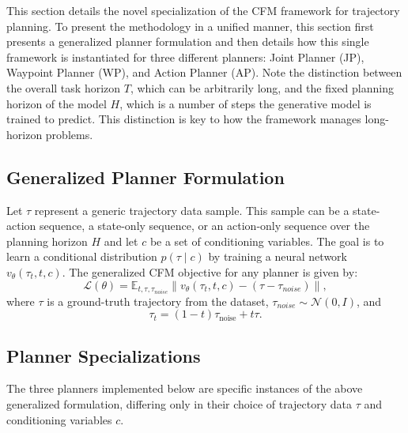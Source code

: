 This section details the novel specialization of the CFM framework for trajectory planning. To present the methodology in a unified manner, this section first presents a generalized planner formulation and then details how this single framework is instantiated for three different planners: Joint Planner (JP), Waypoint Planner (WP), and Action Planner (AP).  Note the distinction between the overall task horizon $T$, which can be arbitrarily long, and the fixed planning horizon of the model $H$, which is a number of steps the generative model is trained to predict. This distinction is key to how the framework manages long-horizon problems.
\subsection{Generalized Planner Formulation}
Let $\tau$ represent a generic trajectory data sample. This sample can be a state-action sequence, a state-only sequence, or an action-only sequence over the planning horizon $H$ and let $c$ be a set of conditioning variables. The goal is to learn a conditional distribution $p(\tau \mid c)$ by training a neural network $v_{\theta}(\tau_t, t, c)$. 
The generalized CFM objective for any planner is given by:
\begin{equation}
	\mathcal{L}(\theta) = \mathbb{E}_{t, \tau, \tau_{noise}} 
\|v_{\theta}(\tau_t, t, c) - (\tau-\tau_{noise})\|,
\end{equation}
where $\tau$ is a ground-truth trajectory from the dataset, $\tau_{noise} \sim \mathcal{N}(0,I)$, and
\begin{equation}
	\tau_{t} = (1-t) \tau_{\text{noise}} + t\tau.
\end{equation}


\subsection{Planner Specializations}
The three planners implemented below are specific instances of the above generalized formulation, differing only in their choice of trajectory data $\tau$ and conditioning variables $c$. 

